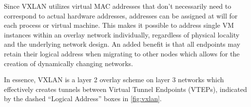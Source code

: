 Since VXLAN utilizes virtual MAC addresses that don't necessarily need to correspond to actual hardware addresses, addresses can be assigned at will for each process or virtual machine. This makes it possible to address single VM instances within an overlay network individually, regardless of physical locality and the underlying network design. An added benefit is that all endpoints may retain their logical address when migrating to other nodes which allows for the creation of dynamically changing networks. 

In essence, VXLAN is a layer 2 overlay scheme on layer 3 networks which effectively creates tunnels between Virtual Tunnel Endpoints (VTEPs), indicated by the dashed ``Logical Address'' boxes in \autoref{fig:vxlan}.  











%
%
%
%
%
%
%
%
%
%


